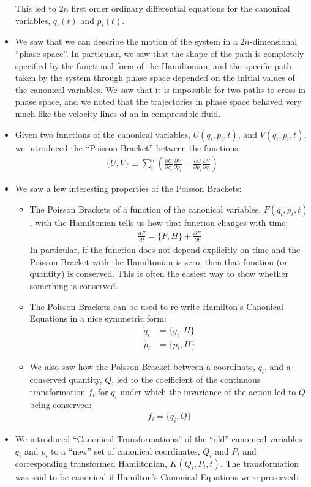 \documentclass[10pt]{report}
\newcommand{\die}[2]{\frac{\partial #1}{\partial #2}}
\begin{document}
\begin{itemize}
This led to $2n$ first order ordinary differential equations for the canonical variables, $q_i(t)$ and $p_i(t)$.
\item We saw that we can describe the motion of the system in a $2n$-dimensional ``phase space''. In  particular, we saw that the shape of the path is completely specified by the functional form of the Hamiltonian, and the specific path taken by the system through phase space depended on the initial values of the canonical variables. We saw that it is impossible for two paths to cross in phase space, and we noted that the trajectories in phase space behaved very much like the velocity lines of an in-compressible fluid.
\item Given two functions of the canonical variables, $U(q_i,p_i,t)$, and $V(q_i, p_i, t)$, we introduced the ``Poisson Bracket'' between the functions:
\begin{align*}
\{U,V\}\equiv\sum_i^n\left(\die{U}{q_i}\die{V}{p_i}-\die{U}{p_i}\die{V}{q_i}\right)
\end{align*}
\item We saw a few interesting properties of the Poisson Brackets:
\begin{itemize}
\item The Poisson Brackets of a function of the canonical variables, $F(q_i,p_i,t)$, with the Hamiltonian tells us how that function changes with time:
\begin{align*}
\frac{dF}{dt}=\{F,H\}+\die{F}{t}
\end{align*}
In particular, if the function does not depend explicitly on time and the Poisson Bracket with the Hamiltonian is zero, then that function (or quantity) is conserved. This is often the easiest way to show whether something is conserved. 
\item The Poisson Brackets can be used to re-write Hamilton's Canonical Equations in a nice symmetric form:
\begin{align*}
\dot q_i&=\{q_i,H\}\\
\dot p_i&=\{p_i,H\}
\end{align*} 
\item We also saw how the Poisson Bracket between a coordinate, $q_i$, and a conserved quantity, $Q$,  led to the coefficient of the continuous transformation $f_i$ for $q_i$ under which the invariance of the action led to $Q$ being conserved:
\begin{align*}
f_i = \{q_i,Q\}
\end{align*}
\end{itemize}
\item We introduced ``Canonical Transformations'' of the ``old'' canonical variables $q_i$ and $p_i$ to a ``new'' set of canonical coordinates, $Q_i$ and $P_i$ and corresponding transformed Hamiltonian, $K(Q_i,P_i,t)$. The transformation was said to be canonical if Hamilton's Canonical Equations were preserved:

\end{itemize}
\end{document}
